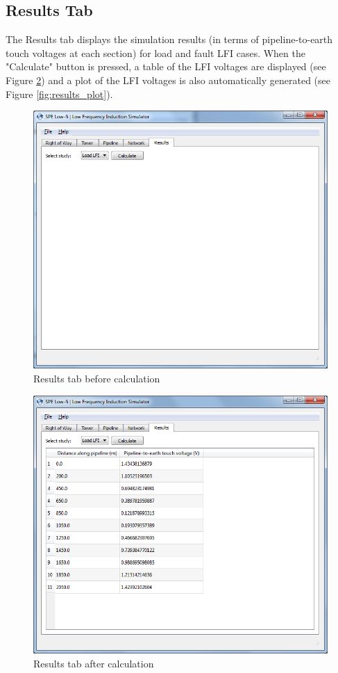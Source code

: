 \documentclass{article}
\begin{document}
\subsection{Results Tab}
The Results tab displays the simulation results (in terms of pipeline-to-earth touch voltages at each section) for load and fault LFI cases. When the "Calculate" button is pressed, a table of the LFI voltages are displayed (see Figure \ref{fig:results_after_calc}) and a plot of the LFI voltages is also automatically generated (see Figure \ref{fig:results_plot}). 

\begin{figure}[!htp]
\begin{center}
\caption{Results tab before calculation}
\label{fig:results_before_calc}
\includegraphics[width=0.9\linewidth]{./Figures/results_1.png}
\end{center}
\end{figure}

\begin{figure}[!htpb]
\begin{center}
\caption{Results tab after calculation}
\label{fig:results_after_calc}
\includegraphics[width=0.7\linewidth]{./Figures/load_lfi_results.png}
\end{center}
\end{figure}
\end{document}
